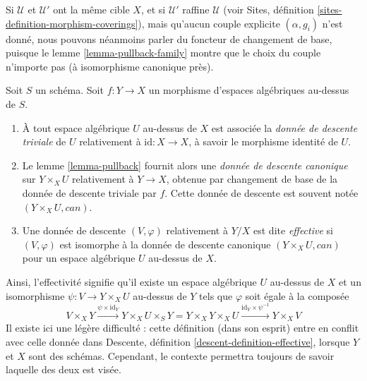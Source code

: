 \noindent
Si $\mathcal{U}$ et $\mathcal{U}'$ ont la même cible $X$,
et si $\mathcal{U}'$ raffine $\mathcal{U}$ (voir
Sites, définition \ref{sites-definition-morphism-coverings}),
mais qu'aucun couple explicite $(\alpha, g_i)$ n'est donné, nous pouvons néanmoins
parler du foncteur de changement de base, puisque le
lemme \ref{lemma-pullback-family} montre que le choix du couple n'importe pas
(à isomorphisme canonique près).

\begin{definition}
\label{definition-effective}
Soit $S$ un schéma. Soit $f : Y \to X$ un morphisme d'espaces algébriques au-dessus de
$S$.
\begin{enumerate}
\item À tout espace algébrique $U$ au-dessus de $X$ est associée la
{\it donnée de descente triviale} de $U$ relativement à $\text{id} : X \to X$, à savoir
le morphisme identité de $U$.
\item Le lemme \ref{lemma-pullback} fournit alors une
{\it donnée de descente canonique} sur $Y \times_X U$
relativement à $Y \to X$, obtenue par changement de base de la donnée de descente
triviale par $f$. Cette donnée de descente est souvent
notée $(Y \times_X U, can)$.
\item Une donnée de descente $(V, \varphi)$ relativement à $Y/X$
est dite {\it effective} si $(V, \varphi)$
est isomorphe à la donnée de descente canonique
$(Y \times_X U, can)$ pour un espace algébrique $U$ au-dessus de $X$.
\end{enumerate}
\end{definition}

\noindent
Ainsi, l'effectivité signifie qu'il existe un espace algébrique $U$
au-dessus de $X$ et un isomorphisme $\psi : V \to Y \times_X U$
au-dessus de $Y$ tels que $\varphi$ soit égale à la composée
$$
V \times_X Y \xrightarrow{\psi \times \text{id}_Y}
Y \times_X U \times_S Y =
Y \times_X Y \times_X U
\xrightarrow{\text{id}_Y \times \psi^{-1}}
Y \times_X V
$$
Il existe ici une légère difficulté : cette définition
(dans son esprit) entre en conflit avec celle donnée dans
Descente, définition \ref{descent-definition-effective},
lorsque $Y$ et $X$ sont des schémas. Cependant, le contexte permettra toujours
de savoir laquelle des deux est visée.

